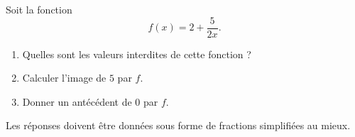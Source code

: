 
\begin{exercice}\label{exosmath-0364}

    Soit la fonction
    \begin{equation}
        f(x)=2+\frac{ 5 }{ 2x }.
    \end{equation}
    \begin{enumerate}
        \item
            Quelles sont les valeurs interdites de cette fonction ?
        \item
            Calculer l'image de \( 5\) par \( f\).
        \item
            Donner un antécédent de \( 0\) par \( f\).
    \end{enumerate}
    Les réponses doivent être données sous forme de fractions simplifiées au mieux.

\end{exercice}

